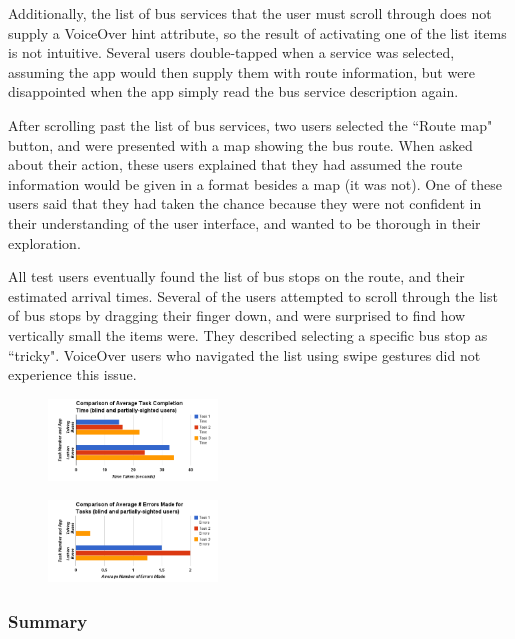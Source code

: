 \documentclass[10pt,twocolumn]{article}
\begin{document}
Additionally, the list of bus services that the user must scroll through does not supply a VoiceOver hint attribute, so the result of activating one of the list items is not intuitive. Several users double-tapped when a service was selected, assuming the app would then supply them with route information, but were disappointed when the app simply read the bus service description again.

After scrolling past the list of bus services, two users selected the ``Route map" button, and were presented with a map showing the bus route. When asked about their action, these users explained that they had assumed the route information would be given in a format besides a map (it was not). One of these users said that they had taken the chance because they were not confident in their understanding of the user interface, and wanted to be thorough in their exploration.

All test users eventually found the list of bus stops on the route, and their estimated arrival times. Several of the users attempted to scroll through the list of bus stops by dragging their finger down, and were surprised to find how vertically small the items were. They described selecting a specific bus stop as ``tricky". VoiceOver users who navigated the list using swipe gestures did not experience this issue.

\begin{figure}[tb]
  \centering
    \includegraphics[width=0.4\textwidth]{chart_1}
    \label{fig:chart1}
\end{figure}

\begin{figure}[bt]
  \centering
    \includegraphics[width=0.4\textwidth]{chart_2}
    \label{fig:chart2}
\end{figure}

\subsubsection{Summary}
\end{document}
